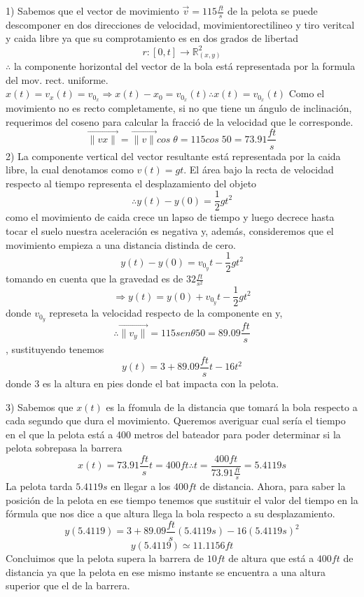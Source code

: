 \documentclass{article}
\begin{document}
    1) Sabemos que el vector de movimiento $\vec{v}=115\frac{ft}{s}$ de la pelota se puede descomponer en dos direcciones de velocidad, movimientorectilineo y tiro veritcal y caida libre ya que su comprotamiento es en dos grados de libertad $$r:\left[0,t\right]\rightarrow \mathbb{R}^2_{(x,y)}$$
    $\therefore$ la componente horizontal del  vector de la bola está representada por la formula del mov. rect. uniforme.$x(t)=v_x(t)=v_{0_x}\Rightarrow x(t)-x_{0}=v_{0_x}(t)\therefore x(t)=v_{0_x}(t)$
    Como el movimiento no es recto completamente, si no que tiene un ángulo de inclinación, requerimos del coseno para calcular la fracció de la velocidad que le corresponde. $$\vec{\|vx\|}=\vec{\|v\|}cos\;\theta = 115cos\;50 = 73.91\frac{ft}{s}$$
    2) La componente vertical del vector resultante está representada por la caida libre, la cual denotamos como $v(t)=gt$.
    El área bajo la recta de velocidad respecto al tiempo representa el desplazamiento del objeto $$\therefore y(t)-y(0)=\frac{1}{2}gt^2$$
    como el movimiento de caida crece un lapso de tiempo y luego decrece hasta tocar el suelo nuestra aceleración es negativa y, además, consideremos que el movimiento empieza a una distancia distinda de cero.$$y(t)-y(0)=v_{0_y}t-\frac{1}{2}gt^2$$ tomando en cuenta que la gravedad es de $32\frac{ft}{s^2}$ $$\Rightarrow y(t)=y(0)+v_{0_y}t-\frac{1}{2}gt^2$$ donde $v_{0_y}$ represeta la velocidad respecto de la componente en y, $$\therefore \vec{\|v_y\|}=115 sen\theta 50=89.09\frac{ft}{s}$$, sustituyendo tenemos$$y(t)=3+89.09\frac{ft}{s}t-16t^2$$ donde 3 es la altura en pies donde el bat impacta con la pelota.
    
    \vspace{5mm} %
    
    3) Sabemos que $x(t)$ es la fŕomula de la distancia que tomará la bola respecto a cada segundo que dura el movimiento. Queremos averiguar cual sería el tiempo en el que la pelota está a 400 metros del bateador para poder determinar si la pelota sobrepasa la barrera
    $$x(t)=73.91\frac{ft}{s}t=400ft\therefore t=\frac{400ft}{73.91\frac{ft}{s}}=5.4119s$$
    La pelota tarda $5.4119s$ en llegar a los $400 ft$ de distancia.
    Ahora, para saber la posición de la pelota en ese tiempo tenemos que sustituir el valor del tiempo en la fórmula que nos dice a que altura llega la bola respecto a su desplazamiento.
    $$y(5.4119)=3+89.09\frac{ft}{s}(5.4119s)-16(5.4119s)^2$$
        $$y(5.4119) \simeq 11.1156ft$$
    Concluimos que la pelota supera la barrera de $10ft$ de altura que está a $400 ft$ de distancia ya que la pelota en ese mismo instante se encuentra a una altura superior que el de la barrera.
    
\end{document}
